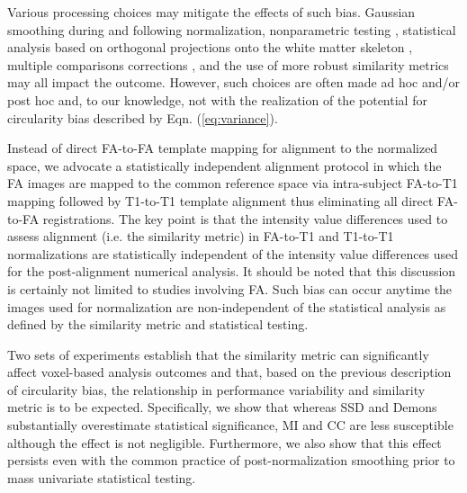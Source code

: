 \documentclass[final,5p,times,twocolumn]{elsarticle}
\begin{document}
Various processing choices may mitigate the effects of such bias.  Gaussian smoothing during and following normalization, 
nonparametric testing \citep{Rorden2007}, 
statistical analysis based on orthogonal projections onto the white matter skeleton 
\citep{Smith2006}, multiple comparisons corrections \citep{Nichols2003},
and the use of more robust similarity metrics may all impact the
outcome.  However, such choices are often made ad hoc and/or post hoc and, to our 
knowledge, not with the realization of the potential
for circularity bias described by Eqn. (\ref{eq:variance}).  

Instead of direct FA-to-FA template mapping for 
alignment to the normalized space, we advocate a statistically 
independent alignment protocol in which the FA images are mapped to 
the common reference space via intra-subject FA-to-T1 mapping 
followed by T1-to-T1 template alignment thus eliminating all direct
FA-to-FA registrations. The key point is that the intensity value differences used 
to assess alignment (i.e. the similarity metric) in FA-to-T1 and T1-to-T1 
normalizations are statistically independent of the intensity value differences used for 
the post-alignment numerical analysis.  It should be noted that this discussion
is certainly not limited to studies involving FA.  
Such bias can occur anytime the images used for normalization
are non-independent of the statistical analysis as defined by the similarity
metric and statistical testing. {}

Two sets of experiments establish that the similarity metric
can significantly affect voxel-based analysis outcomes and that,
based on the previous description of circularity bias,
the relationship in performance variability and similarity metric
is to be expected.  Specifically, we show that whereas SSD and Demons
substantially overestimate statistical significance, MI and CC are less susceptible although the
effect is not
negligible.  Furthermore, we also show that this effect persists
even with the common practice of post-normalization smoothing prior
to mass univariate statistical testing.
\end{document}
